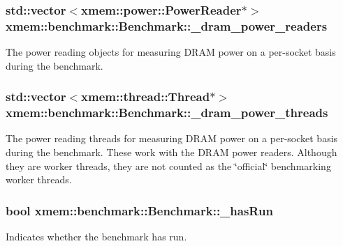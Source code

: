 \subsubsection[{\+\_\+dram\+\_\+power\+\_\+readers}]{\setlength{\rightskip}{0pt plus 5cm}std\+::vector$<${\bf xmem\+::power\+::\+Power\+Reader}$\ast$$>$ xmem\+::benchmark\+::\+Benchmark\+::\+\_\+dram\+\_\+power\+\_\+readers\hspace{0.3cm}{\ttfamily [protected]}}\label{classxmem_1_1benchmark_1_1_benchmark_a6d4445364d9b6f17ec78be6c8cf253f1}
The power reading objects for measuring D\+R\+A\+M power on a per-\/socket basis during the benchmark. \hypertarget{classxmem_1_1benchmark_1_1_benchmark_a7aa95682a12f8fe4262b1fffb088d6ac}{}
\subsubsection[{\+\_\+dram\+\_\+power\+\_\+threads}]{\setlength{\rightskip}{0pt plus 5cm}std\+::vector$<${\bf xmem\+::thread\+::\+Thread}$\ast$$>$ xmem\+::benchmark\+::\+Benchmark\+::\+\_\+dram\+\_\+power\+\_\+threads\hspace{0.3cm}{\ttfamily [protected]}}\label{classxmem_1_1benchmark_1_1_benchmark_a7aa95682a12f8fe4262b1fffb088d6ac}
The power reading threads for measuring D\+R\+A\+M power on a per-\/socket basis during the benchmark. These work with the D\+R\+A\+M power readers. Although they are worker threads, they are not counted as the \char`\"{}official\char`\"{} benchmarking worker threads. \hypertarget{classxmem_1_1benchmark_1_1_benchmark_a7caa584aa404d7751b781fd16c111fd0}{}
\subsubsection[{\+\_\+has\+Run}]{\setlength{\rightskip}{0pt plus 5cm}bool xmem\+::benchmark\+::\+Benchmark\+::\+\_\+has\+Run\hspace{0.3cm}{\ttfamily [protected]}}\label{classxmem_1_1benchmark_1_1_benchmark_a7caa584aa404d7751b781fd16c111fd0}
Indicates whether the benchmark has run. \hypertarget{classxmem_1_1benchmark_1_1_benchmark_a1001cb321d8d655a71d435f5a06fdd3a}{}
